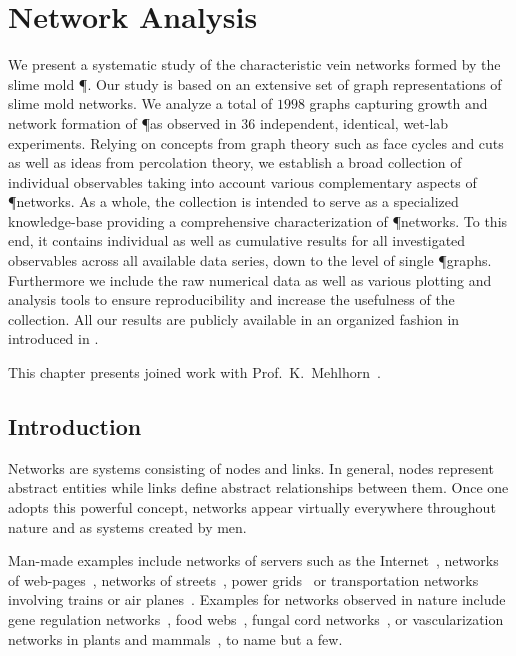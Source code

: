 \chapter{Network Analysis}\label{chap:analysis}

	We present a systematic study of the characteristic vein networks formed by the slime mold \P. Our study is based on an extensive set of graph representations of slime mold networks. We analyze a total of $1998$ graphs capturing growth and network formation of \P as observed in $36$ independent, identical, wet-lab experiments. Relying on concepts from graph theory such as face cycles and cuts as well as ideas from percolation theory, we establish a broad collection of individual observables taking into account various complementary aspects of \P networks. As a whole, the collection is intended to serve as a specialized knowledge-base providing a comprehensive characterization of \P networks. To this end, it contains individual as well as cumulative results for all investigated observables across all available data series, down to the level of single \P graphs. Furthermore we include the raw numerical data as well as various plotting and analysis tools to ensure reproducibility and increase the usefulness of the collection. All our results are publicly available in an organized fashion in \SMGR introduced in .
	
	This chapter presents joined work with Prof.~K.~Mehlhorn~\cite{dirnberger2016}.

\section{Introduction}		

	Networks are systems consisting of nodes and links. In general, nodes represent abstract entities while links define abstract relationships between them. Once one adopts this powerful concept, networks appear virtually everywhere throughout nature and as systems created by men.

	Man-made examples include networks of servers such as the Internet~\cite{faloutsos1999power,karagiannis2004long,huberman1999internet}, networks of web-pages~\cite{adamic2000power}, networks of streets~\cite{jiang2004topological,buhl2006topological}, power grids~\cite{rohden2012self,zhongwei2004comparison} or transportation networks involving trains or air planes~\cite{barrat2004weighted,guimera2004modeling,sienkiewicz2005statistical,sen2003small}. Examples for networks observed in nature include gene regulation networks~\cite{alon1999robustness,milo2002network}, food webs~\cite{pimm1991food,montoya2006ecological}, fungal cord networks~\cite{fricker2007network,heaton2012analysis}, or vascularization networks in plants and mammals~\cite{katifori2010damage,roth2001evolution,koizumi2000series}, to name but a few. 


